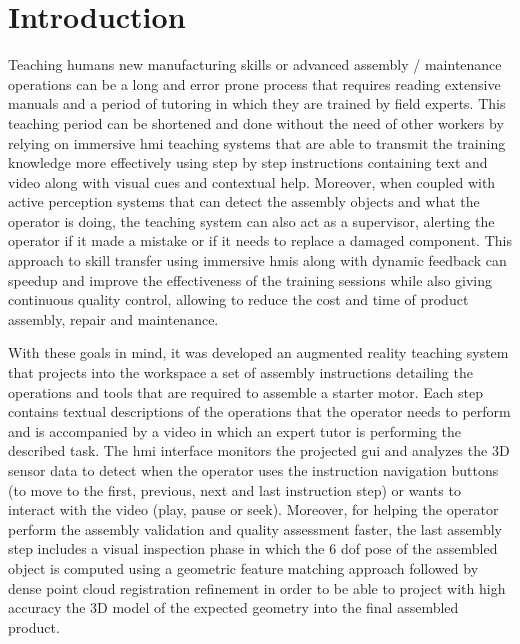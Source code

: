 \section{Introduction}\label{sec:introduction}

Teaching humans new manufacturing skills or advanced assembly / maintenance operations can be a long and error prone process that requires reading extensive manuals and a period of tutoring in which they are trained by field experts. This teaching period can be shortened and done without the need of other workers by relying on immersive \gls{hmi} teaching systems that are able to transmit the training knowledge more effectively using step by step instructions containing text and video along with visual cues and contextual help. Moreover, when coupled with active perception systems that can detect the assembly objects and what the operator is doing, the teaching system can also act as a supervisor, alerting the operator if it made a mistake or if it needs to replace a damaged component. This approach to skill transfer using immersive \glspl{hmi} along with dynamic feedback can speedup and improve the effectiveness of the training sessions while also giving continuous quality control, allowing to reduce the cost and time of product assembly, repair and maintenance.

With these goals in mind, it was developed an augmented reality teaching system that projects into the workspace a set of assembly instructions detailing the operations and tools that are required to assemble a starter motor. Each step contains textual descriptions of the operations that the operator needs to perform and is accompanied by a video in which an expert tutor is performing the described task. The \gls{hmi} interface monitors the projected \gls{gui} and analyzes the 3D sensor data to detect when the operator uses the instruction navigation buttons (to move to the first, previous, next and last instruction step) or wants to interact with the video (play, pause or seek). Moreover, for helping the operator perform the assembly validation and quality assessment faster, the last assembly step includes a visual inspection phase in which the 6 \gls{dof} pose of the assembled object is computed using a geometric feature matching approach followed by dense point cloud registration refinement in order to be able to project with high accuracy the 3D model of the expected geometry into the final assembled product.

